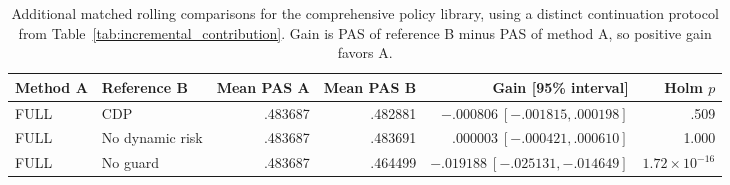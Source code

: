 \begin{table}[!t]
\centering\small
\caption{Additional matched rolling comparisons for the comprehensive policy library, using a distinct continuation protocol from Table~\ref{tab:incremental_contribution}. Gain is PAS of reference B minus PAS of method A, so positive gain favors A.}
\label{tab:rolling_main}
\begin{tabular}{llrrrr}
\toprule
Method A & Reference B & Mean PAS A & Mean PAS B & Gain [95\% interval] & Holm $p$\\
\midrule
FULL & CDP & .483687 & .482881 & $-.000806\ [-.001815,.000198]$ & .509\\
FULL & No dynamic risk & .483687 & .483691 & $.000003\ [-.000421,.000610]$ & 1.000\\
FULL & No guard & .483687 & .464499 & $-.019188\ [-.025131,-.014649]$ & $1.72\!\times\!10^{-16}$\\
\bottomrule
\end{tabular}
\end{table}
